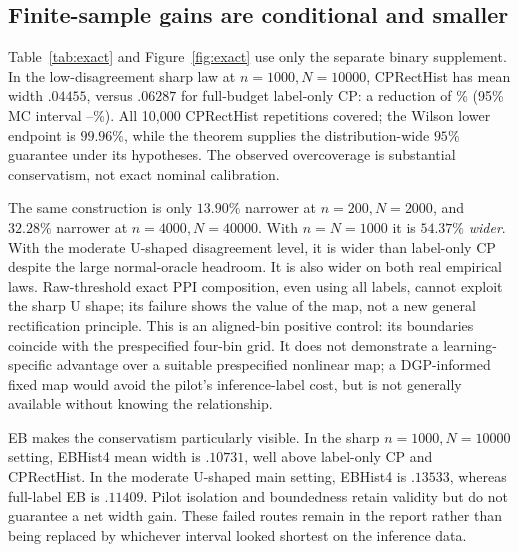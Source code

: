 \documentclass{article}
\begin{document}
\subsection{Finite-sample gains are conditional and smaller}
Table~\ref{tab:exact} and Figure~\ref{fig:exact} use only the separate binary supplement. In the low-disagreement sharp law at $n=1000,N=10000$, CPRectHist has mean width $.04455$, versus $.06287$ for full-budget label-only CP: a reduction of \ExactGain\% (95\% MC interval \ExactGainLo--\ExactGainHi\%). All 10,000 CPRectHist repetitions covered; the Wilson lower endpoint is $99.96\%$, while the theorem supplies the distribution-wide $95\%$ guarantee under its hypotheses. The observed overcoverage is substantial conservatism, not exact nominal calibration.

The same construction is only $13.90\%$ narrower at $n=200,N=2000$, and $32.28\%$ narrower at $n=4000,N=40000$. With $n=N=1000$ it is $54.37\%$ \emph{wider}. With the moderate U-shaped disagreement level, it is wider than label-only CP despite the large normal-oracle headroom. It is also wider on both real empirical laws. Raw-threshold exact PPI composition, even using all labels, cannot exploit the sharp U shape; its failure shows the value of the map, not a new general rectification principle. This is an aligned-bin positive control: its boundaries coincide with the prespecified four-bin grid. It does not demonstrate a learning-specific advantage over a suitable prespecified nonlinear map; a DGP-informed fixed map would avoid the pilot's inference-label cost, but is not generally available without knowing the relationship.

EB makes the conservatism particularly visible. In the sharp $n=1000,N=10000$ setting, EBHist4 mean width is $.10731$, well above label-only CP and CPRectHist. In the moderate U-shaped main setting, EBHist4 is $.13533$, whereas full-label EB is $.11409$. Pilot isolation and boundedness retain validity but do not guarantee a net width gain. These failed routes remain in the report rather than being replaced by whichever interval looked shortest on the inference data.

\begin{table}[t]
\caption{Finite-sample-valid binary composition versus full-budget label-only exact CP, in the separate supplementary suite. Both have mathematical coverage at least $95\%$ under the iid model. Width-ratio brackets are paired 95\% MC intervals; coverage brackets are marginal Wilson intervals. Sharp settings use 5,000 repetitions except $(1000,10000)$, which uses 10,000; other rows use 5,000.}
\label{tab:exact}
\centering\small
{\setlength{\tabcolsep}{4pt}}
\end{table}
\end{document}
